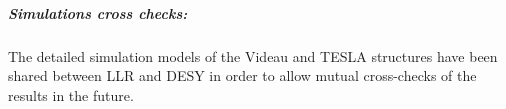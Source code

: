 \subparagraph{\textbf{Simulations cross checks:}} 

The detailed simulation models of the Videau and TESLA structures have been shared between LLR and DESY in order to allow mutual cross-checks of the results in the future. 



\vspace{2cm}

